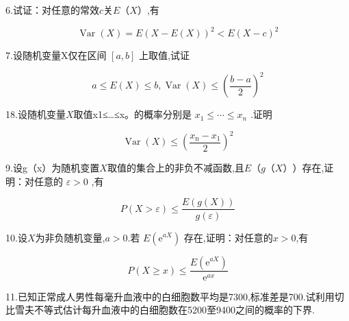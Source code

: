 6.试证：对任意的常效$ c $关$ E（X） $,有

\[
\operatorname{Var}(X)=E(X-E(X))^{2}<E(X-c)^{2}
\]

7.设随机变量X仅在区间 $[a, b]$ 上取值,试证

\[
a \leqslant E(X) \leqslant b, \operatorname{Var}(X) \leqslant\left(\frac{b-a}{2}\right)^{2}
\]

18.设随机变量$ X $取值x1≤…≤x。的概率分别是 $x_{1} \leqslant \cdots \leqslant x_{n}$ .证明

\[
\operatorname{Var}(X) \leqslant\left(\frac{x_{\mathrm{n}}-x_{1}}{2}\right)^{2}
\]

9.设g（x）为随机变置$ X $取值的集合上的非负不减函数,且$ E（g（X）） $存在,证明：对任意的 $\varepsilon>0$ ,有

\[
P(X>\varepsilon) \leqslant \frac{E(g(X))}{g(\varepsilon)}
\]

10.设$ X $为非负随机变量,$ a>0 $.若 $E\left(\mathrm{e}^{a X}\right)$ 存在,证明：对任意的$ x>0 $,有

\[
P(X \geqslant x) \leqslant \frac{E\left(\mathrm{e}^{a X}\right)}{\mathrm{e}^{a x}}
\]

11.已知正常成人男性每毫升血液中的白细胞数平均是7300,标准差是700.试利用切比雪夫不等式估计每升血液中的白细胞数在5200至9400之间的概率的下界.